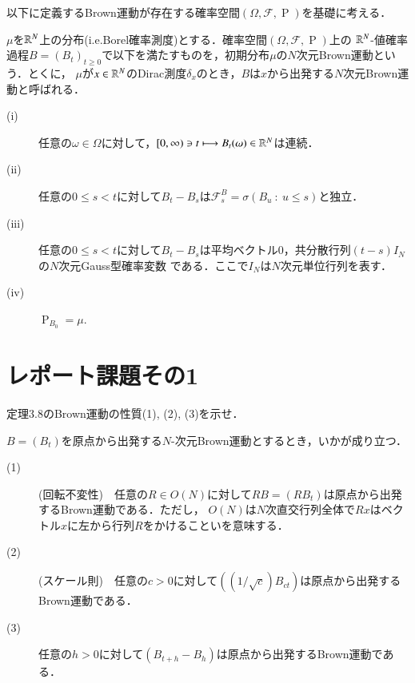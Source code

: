 
以下に定義するBrown運動が存在する確率空間$(\Omega, \mathcal{F}, \operatorname{P})$を基礎に考える．

\begin{dfn}
	$\mu$を$\mathbb{R}^N$上の分布(i.e.Borel確率測度)とする．確率空間$(\Omega, \mathcal{F}, \operatorname{P})$上の
	$\mathbb{R}^N$-値確率過程$B = (B_t)_{t \geq 0}$で以下を満たすものを，初期分布$\mu$の$N$次元Brown運動という．とくに，
	$\mu$が$x \in \mathbb{R}^N$のDirac測度$\delta_x$のとき，$B$は$x$から出発する$N$次元Brown運動と呼ばれる．
	\begin{description}
		\item[\rm{(i)}] 任意の$\omega \in \Omega$に対して，$[0,\infty) \ni t \longmapsto B_t(\omega) \in \mathbb{R}^N$は連続．
		\item[\rm{(ii)}] 任意の$0 \leq s < t$に対して$B_t - B_s$は$\mathcal{F}_s^B = \sigma(B_u\ :\ u \leq s)$と独立．
		\item[\rm{(iii)}] 任意の$0 \leq s < t$に対して$B_t - B_s$は平均ベクトル0，共分散行列$(t-s)I_N$の$N$次元Gauss型確率変数
			である．ここで$I_N$は$N$次元単位行列を表す．
		\item[\rm{(iv)}] $\operatorname{P}_{B_0} = \mu$.
	\end{description}
\end{dfn}

\section{レポート課題その1}


定理3.8のBrown運動の性質(1), (2), (3)を示せ．
\begin{thm}[定理3.8]
$B = (B_t)$を原点から出発する$N$-次元Brown運動とするとき，いかが成り立つ．
\begin{description}
	\item[(1)](回転不変性)　任意の$R \in O(N)$に対して$RB = (RB_t)$は原点から出発するBrown運動である．ただし，
		$O(N)$は$N$次直交行列全体で$Rx$はベクトル$x$に左から行列$R$をかけることいを意味する．
	\item[(2)](スケール則)　任意の$c > 0$に対して$((1/\sqrt{c})B_{ct})$は原点から出発するBrown運動である．
	\item[(3)] 任意の$h > 0$に対して$(B_{t+h} - B_h)$は原点から出発するBrown運動である．
\end{description}
\end{thm}

